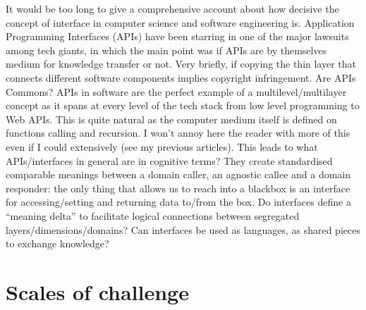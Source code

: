 \documentclass[14pt]{extarticle}
\begin{document}
\hspace*{15mm}It would be too long to give a comprehensive account about how decisive the concept of interface in computer science and software engineering is. Application Programming Interfaces (APIs) have been starring in one of the major lawsuits among tech giants, in which the main point was if APIs are by themselves medium for knowledge transfer or not. Very briefly, if copying the thin layer that connects different software components implies copyright infringement. Are APIs Commons?
APIs in software are the perfect example of a multilevel/multilayer concept as it spans at every level of the tech stack from low level programming to Web APIs. This is quite natural as the computer medium itself is defined on functions calling and recursion. I won’t annoy here the reader with more of this even if I could extensively (see my previous articles).
\newline
\hspace*{15mm}This leads to what APIs/interfaces in general are in cognitive terms? They create standardised comparable meanings between a domain caller, an agnostic callee and a domain responder: the only thing that allows us to reach into a blackbox is an interface for accessing/setting and returning  data to/from the box. Do interfaces define a “meaning delta” to facilitate logical connections between segregated layers/dimensions/domains? Can interfaces be used as languages, as shared pieces to exchange knowledge?


\section*{Scales of challenge}
\label{sec:scales}%
\end{document}

